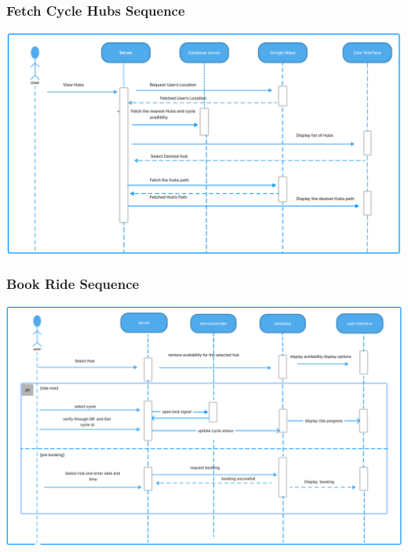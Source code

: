 \documentclass[11pt]{article}
\begin{document}
\subsubsection{Fetch Cycle Hubs Sequence}
\begin{center}
  \includegraphics[scale=0.28]{sequence-diagram-images/fetch_hubs.png}
\end{center}

\subsubsection{Book Ride Sequence}
\begin{center}
  \includegraphics[scale=0.27]{sequence-diagram-images/book.png}
\end{center}
\end{document}
